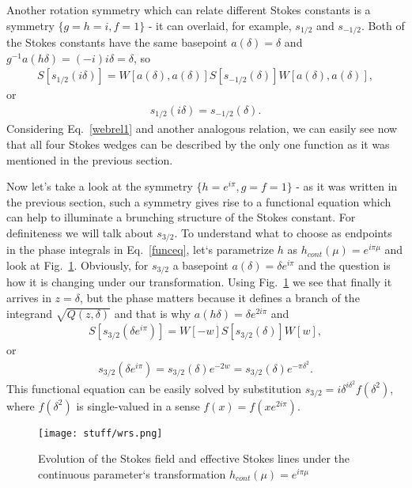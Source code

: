 \documentclass[aps,prl,preprint,superscriptaddress]{revtex4}
\begin{document}
Another rotation symmetry which can relate different Stokes constants is a symmetry $\{g=h=i,f=1\}$ - it can overlaid, for example, 
$s_{1/2}$ and $s_{-1/2}$. Both of the Stokes constants have the same basepoint $a(\delta)=\delta$ 
and $g^{-1}a(h\delta)=(-i)i\delta=\delta$, so
\begin{eqnarray}
S[s_{1/2}(i\delta)] = W[a(\delta),a(\delta)]S[s_{-1/2}(\delta)]W[a(\delta),a(\delta)],
\label{webrs2}
\end{eqnarray}
or
\begin{eqnarray}
s_{1/2}(i\delta) = s_{-1/2}(\delta).
\label{webrel2}
\end{eqnarray}
Considering Eq.~\ref{webrel1} and another analogous relation, we can easily see now that all four Stokes wedges can be described by the only one function as it was mentioned in the previous section. 

Now let's take a look at the symmetry $\{h=e^{i\pi},g=f=1\}$ - as it was written in the previous section, such a symmetry gives rise to a functional equation which can help to illuminate a brunching structure of the Stokes constant. 
For definiteness we will talk about $s_{3/2}$. To understand what to choose as endpoints in the phase integrals in Eq.~\ref{funceq}, let`s parametrize $h$ as $h_{cont}(\mu)=e^{i\pi\mu}$ and look at Fig.~\ref{wrs}. Obviously, for $s_{3/2}$ a basepoint $a(\delta)=\delta e^{i\pi}$ and the question is how it is changing under our transformation. Using Fig.~\ref{wrs} we see that finally it arrives in $z=\delta$, but the phase matters because it defines a branch of the integrand $\sqrt{Q(z,\delta)}$ and that is why 
$a(h\delta)=\delta e^{2i\pi}$ and
\begin{eqnarray}
S[s_{3/2}(\delta e^{i\pi})] = W[-w]S[s_{3/2}(\delta)]W[w],
\label{webrs3}
\end{eqnarray}
or
\begin{eqnarray}
s_{3/2}(\delta e^{i\pi})=s_{3/2}(\delta)e^{-2w}=s_{3/2}(\delta)e^{-\pi\delta^2}.
\label{webrel3}
\end{eqnarray}
This functional equation can be easily solved by substitution $s_{3/2}=i\delta^{i\delta^2}f(\delta^2)$, where $f(\delta^2)$
is single-valued in a sense $f(x)=f(x e^{2i\pi})$.

\begin{figure}
\centering
\noindent
\texttt{[image: stuff/wrs.png]}
\caption{Evolution of the Stokes field and effective Stokes lines 
under the continuous parameter`s transformation $h_{cont}(\mu)=e^{i\pi\mu}$}
\label{wrs}
\end{figure} 
\end{document}
